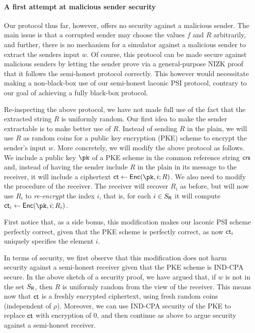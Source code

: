 \paragraph{A first attempt at malicious sender security}
Our protocol thus far, however, offers no security against a malicious sender. The main issue is that a corrupted sender may choose the values $f$ and $R$ arbitrarily, and further, there is no mechanism for a simulator against a malicious sender to extract the senders input $w$. Of course, this protocol can be made secure against malicious senders by letting the sender prove via a general-purpose NIZK proof that it follows the semi-honest protocol correctly. This however would necessitate making a non-black-box use of our semi-honest laconic PSI protocol, contrary to our goal of achieving a fully black-box protocol.

Re-inspecting the above protocol, we have not made full use of the fact that the extracted string $R$ is uniformly random. Our first idea to make the sender extractable is to make better use of $R$. Instead of sending $R$ in the plain, we will use $R$ as random coins for a public key encryption (PKE) scheme to encrypt the sender's input $w$. More concretely, we will modify the above protocol as follows. We include a public key $\pk$ of a PKE scheme in the common reference string $\mathsf{crs}$ and, instead of having the sender include $R$ in the plain in its message to the receiver, it will include a ciphertext $\ct \gets \Enc(\pk,i;R)$. We also need to modify the procedure of the receiver. The receiver will recover $R_i$ as before, but will now use $R_i$ to \emph{re-encrypt} the index $i$, that is, for each $i \in S_{\mathsf{R}}$ it will compute $\ct_i \gets \Enc(\pk,i;R_i)$.

First notice that, as a side bonus, this modification makes our laconic PSI scheme perfectly correct, given that the PKE scheme is perfectly correct, as now $\mathsf{ct}_i$ uniquely specifies the element $i$.

In terms of security, we first observe that this modification does not harm security against a semi-honest receiver given that the PKE scheme is IND-CPA secure. In the above sketch of a security proof, we have argued that, if $w$ is not in the set $S_{\mathsf{R}}$, then  $R$ is uniformly random from the view of the receiver. This means now that $\mathsf{ct}$ is a freshly encrypted ciphertext, using fresh random coins (independent of $\rho$). Moreover, we can use IND-CPA security of the PKE to replace $\mathsf{ct}$ with encryption of $0$, and then continue as above to argue security against a semi-honest receiver. 

